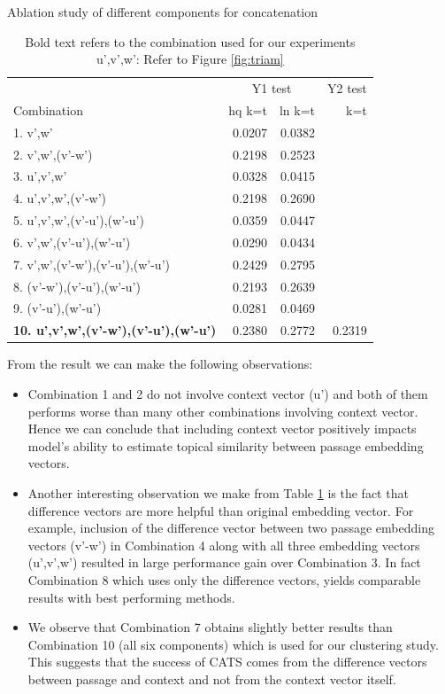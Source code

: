 \begin{table}[t]
\centering
\caption{Ablation study of different components for concatenation}
\label{tab:abl}
\begin{tabular}{@{}lrrr@{}}\toprule
& \multicolumn{2}{c}{Y1 test} & Y2 test  \\
\cmidrule(r){2-3}
\cmidrule(r){4-4}
Combination & hq k=t & ln k=t & k=t \\\midrule
1. v',w' & 0.0207 & 0.0382 &  \\ 
2. v',w',(v'-w') & 0.2198 & 0.2523 & \\
3. u',v',w' & 0.0328 & 0.0415 & \\
4. u',v',w',(v'-w') & 0.2198 & 0.2690 & \\
5. u',v',w',(v'-u'),(w'-u') & 0.0359 & 0.0447 & \\
6. v',w',(v'-u'),(w'-u') & 0.0290 & 0.0434 & \\
7. v',w',(v'-w'),(v'-u'),(w'-u') & 0.2429 & 0.2795 & \\
8. (v'-w'),(v'-u'),(w'-u') & 0.2193 & 0.2639 & \\
9. (v'-u'),(w'-u') & 0.0281 & 0.0469 & \\
\textbf{10. u',v',w',(v'-w'),(v'-u'),(w'-u')} & 0.2380 & 0.2772 & 0.2319 \\
\bottomrule
\end{tabular}
\caption*{Bold text refers to the combination used for our experiments \\
u',v',w': Refer to Figure \ref{fig:triam}}
\end{table}

From the result we can make the following observations:
\begin{itemize}
    \item Combination 1 and 2 do not involve context vector (u') and both of them performs worse than many other combinations involving context vector. Hence we can conclude that including context vector positively impacts model's ability to estimate topical similarity between passage embedding vectors.
    \item Another interesting observation we make from Table \ref{tab:abl} is the fact that difference vectors are more helpful than original embedding vector. For example, inclusion of the difference vector between two passage embedding vectors (v'-w') in Combination 4 along with all three embedding vectors (u',v',w') resulted in large performance gain over Combination 3. In fact Combination 8 which uses only the difference vectors, yields comparable results with best performing methods.
    \item We observe that Combination 7 obtains slightly better results than Combination 10 (all six components) which is used for our clustering study. This suggests that the success of CATS comes from the difference vectors between passage and context and not from the context vector itself. 
\end{itemize}

